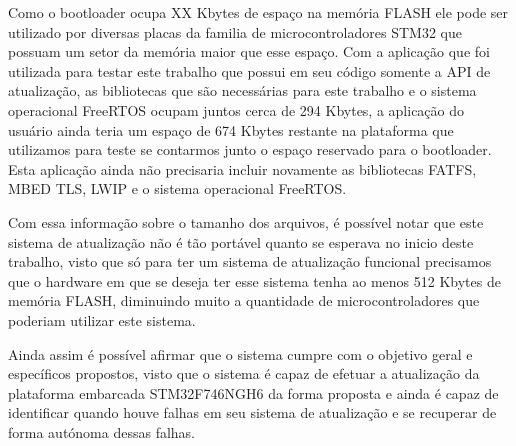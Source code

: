 Como o bootloader ocupa XX Kbytes de espaço na memória FLASH ele pode ser utilizado por diversas placas da familia de microcontroladores STM32 que possuam um setor da memória maior que esse espaço. Com a aplicação que foi utilizada para testar este trabalho que possui em seu código somente a API de atualização, as bibliotecas que são necessárias para este trabalho e o sistema operacional FreeRTOS ocupam juntos cerca de 294 Kbytes, a aplicação do usuário ainda teria um espaço de 674 Kbytes restante na plataforma que utilizamos para teste se contarmos junto o espaço reservado para o bootloader. Esta aplicação ainda não precisaria incluir novamente as bibliotecas FATFS, MBED TLS, LWIP e o sistema operacional FreeRTOS. 

Com essa informação sobre o tamanho dos arquivos, é possível notar que este sistema de atualização não é tão portável quanto se esperava no inicio deste trabalho, visto que só para ter um sistema de atualização funcional precisamos que o hardware em que se deseja ter esse sistema tenha ao menos 512 Kbytes de memória FLASH, diminuindo muito a quantidade de microcontroladores que poderiam utilizar este sistema.

Ainda assim é possível afirmar que o sistema cumpre com o objetivo geral e específicos propostos, visto que o sistema é capaz de efetuar a atualização da plataforma embarcada STM32F746NGH6 da forma proposta e ainda é capaz de identificar quando houve falhas em seu sistema de atualização e se recuperar de forma autónoma dessas falhas.
